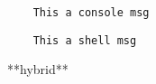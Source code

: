 \documentclass{article}
\begin{document}
    \begin{verbatim}
    This a console msg
    \end{verbatim}

    \begin{verbatim}
    This a shell msg
    \end{verbatim}

    
    \begin{markdown}
    **hybrid**
    \end{markdown}

    
\end{document}
